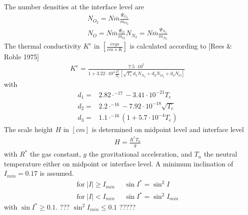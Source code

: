 %
The number densities at the interface level are
%
\begin{align}
   N_{O_2} = N \overline{m} \frac{\Psi_{O_2}}{m_{O_2}} \\
   N_{O} = N \overline{m} \frac{\Psi_{O}}{m_{O}}
   N_{N_2} = N \overline{m} \frac{\Psi_{N_2}}{m_{N_2}}
\end{align}
%
The thermal conductivity $K^e$ in $[\frac{ergs}{cm \; s \; K}]$
is calculated according to [Rees \& Roble 1975]
%
\begin{align}
  K^e = \frac{7.5 \cdot 10^5}{1 + 3.22 \cdot 10^4 \frac{T_e^2}{N_e} [ \sqrt{T_e}
    d_1 N_{N_2} +
    d_2 N_{O_2} +
    d_3 N_{O} ]}
\end{align}
%
with
%
\begin{align}
  d_1 = & 2.82 \cdot^{-17} - 3.41 \cdot 10^{-21} T_e \\
  d_2 = & 2.2 \cdot^{-16} - 7.92 \cdot 10^{-18} \sqrt{T_e} \\
  d_3 = & 1.1 \cdot^{-16}(1+ 5.7 \cdot 10^{-4} {T_e})
\end{align}
%
The scale height $H$ in $[cm]$ is determined on midpoint level and interface level
%
\begin{align}
  H = \frac{R^* T_n}{g}
\end{align}
%
with $R^*$ the gas constant, $g$ the gravitational acceleration,
and $T_n$ the neutral temperature either on midpoint or interface
level. A minimum inclination of $I_{min} = 0.17$ is assumed.
%
\begin{align}
    \text{for} \; |I| \geq I_{min} \; \; & \sin I^* = \sin^2 I \\
    \text{for} \; |I| <   I_{min} \; \; & \sin I^* = \sin^2 I_{min}
\end{align}
%
with $\sin I^* \geq 0.1$. ??? $\sin^2 I_{min} \leq 0.1$ ????? \\

